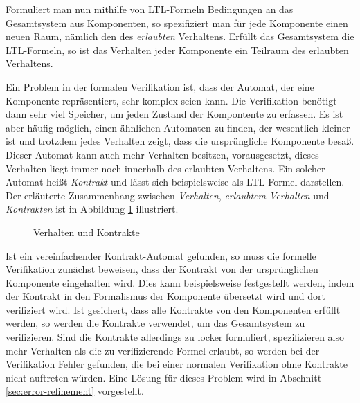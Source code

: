 Formuliert man nun mithilfe von LTL-Formeln Bedingungen an das Gesamtsystem aus Komponenten, so spezifiziert man für jede Komponente einen neuen Raum, nämlich den des \emph{erlaubten} Verhaltens.
Erfüllt das Gesamtsystem die LTL-Formeln, so ist das Verhalten jeder Komponente ein Teilraum des erlaubten Verhaltens.

Ein Problem in der formalen Verifikation ist, dass der Automat, der eine Komponente repräsentiert, sehr komplex seien kann.
Die Verifikation benötigt dann sehr viel Speicher, um jeden Zustand der Kompontente zu erfassen.
Es ist aber häufig möglich, einen ähnlichen Automaten zu finden, der wesentlich kleiner ist und trotzdem jedes Verhalten zeigt, dass die ursprüngliche Komponente besaß.
Dieser Automat kann auch mehr Verhalten besitzen, vorausgesetzt, dieses Verhalten liegt immer noch innerhalb des erlaubten Verhaltens.
Ein solcher Automat heißt \emph{Kontrakt} und lässt sich beispielsweise als LTL-Formel darstellen.
Der erläuterte Zusammenhang zwischen \emph{Verhalten}, \emph{erlaubtem Verhalten} und \emph{Kontrakten} ist in Abbildung \ref{fig:contracts} illustriert.
\begin{figure}[h]
  \centering
  \caption{Verhalten und Kontrakte}
  \label{fig:contracts}
\end{figure}

Ist ein vereinfachender Kontrakt-Automat gefunden, so muss die formelle Verifikation zunächst beweisen, dass der Kontrakt von der ursprünglichen Komponente eingehalten wird.
Dies kann beispielsweise festgestellt werden, indem der Kontrakt in den Formalismus der Komponente übersetzt wird und dort verifiziert wird.
Ist gesichert, dass alle Kontrakte von den Komponenten erfüllt werden, so werden die Kontrakte verwendet, um das Gesamtsystem zu verifizieren.
Sind die Kontrakte allerdings zu locker formuliert, spezifizieren also mehr Verhalten als die zu verifizierende Formel erlaubt, so werden bei der Verifikation Fehler gefunden, die bei einer normalen Verifikation ohne Kontrakte nicht auftreten würden.
Eine Lösung für dieses Problem wird in Abschnitt \ref{sec:error-refinement} vorgestellt.

